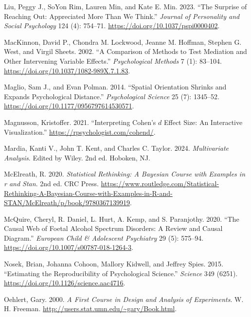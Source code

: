 \documentclass[
  11pt,
  letterpaper,
]{scrbook}
\newlength{\cslhangindent}
\newenvironment{CSLReferences}[2] %
 {\begin{list}{}{%
  \setlength{\itemindent}{0pt}
  \setlength{\leftmargin}{0pt}
  \setlength{\parsep}{0pt}
  \ifodd #1
   \setlength{\leftmargin}{\cslhangindent}
   \setlength{\itemindent}{-1\cslhangindent}
  \fi
  \setlength{\itemsep}{#2\baselineskip}}}
 {\end{list}}
\theoremstyle{definition}
\theoremstyle{definition}
\theoremstyle{remark}
\begin{document}
\begin{CSLReferences}{1}{0}
Liu, Peggy J., SoYon Rim, Lauren Min, and Kate E. Min. 2023. {``The
Surprise of Reaching Out: Appreciated More Than We Think.''}
\emph{Journal of Personality and Social Psychology} 124 (4): 754--71.
\url{https://doi.org/10.1037/pspi0000402}.

MacKinnon, David P., Chondra M. Lockwood, Jeanne M. Hoffman, Stephen G.
West, and Virgil Sheets. 2002. {``A Comparison of Methods to Test
Mediation and Other Intervening Variable Effects.''} \emph{Psychological
Methods} 7 (1): 83--104. \url{https://doi.org/10.1037/1082-989X.7.1.83}.

Maglio, Sam J., and Evan Polman. 2014. {``Spatial Orientation Shrinks
and Expands Psychological Distance.''} \emph{Psychological Science} 25
(7): 1345--52. \url{https://doi.org/10.1177/0956797614530571}.

Magnusson, Kristoffer. 2021. {``Interpreting {C}ohen's \(d\) Effect
Size: An Interactive Visualization.''}
\url{https://rpsychologist.com/cohend/}.

Mardia, Kanti V., John T. Kent, and Charles C. Taylor. 2024.
\emph{Multivariate Analysis}. Edited by Wiley. 2nd ed. Hoboken, NJ.

McElreath, R. 2020. \emph{Statistical Rethinking: A Bayesian Course with
Examples in r and Stan}. 2nd ed. CRC Press.
\url{https://www.routledge.com/Statistical-Rethinking-A-Bayesian-Course-with-Examples-in-R-and-STAN/McElreath/p/book/9780367139919}.

McQuire, Cheryl, R. Daniel, L. Hurt, A. Kemp, and S. Paranjothy. 2020.
{``The Causal Web of Foetal Alcohol Spectrum Disorders: A Review and
Causal Diagram.''} \emph{European Child {\&} Adolescent Psychiatry} 29
(5): 575--94. \url{https://doi.org/10.1007/s00787-018-1264-3}.

Nosek, Brian, Johanna Cohoon, Mallory Kidwell, and Jeffrey Spies. 2015.
{``Estimating the Reproducibility of Psychological Science.''}
\emph{Science} 349 (6251).
\url{https://doi.org/10.1126/science.aac4716}.

Oehlert, Gary. 2000. \emph{A First Course in Design and Analysis of
Experiments}. W. H. Freeman.
\url{http://users.stat.umn.edu/~gary/Book.html}.


\end{CSLReferences}
\end{document}
